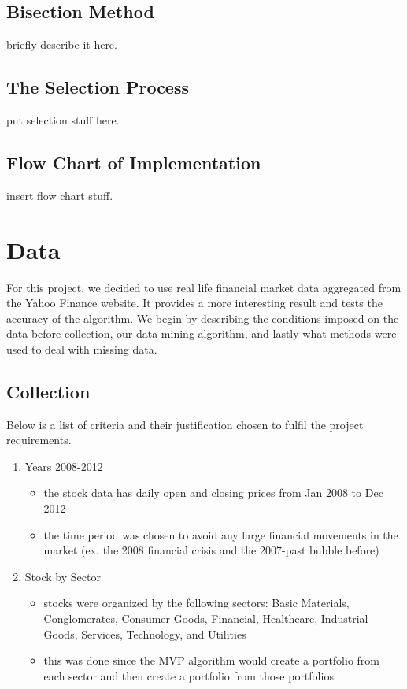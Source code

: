 \documentclass[12pt,titlepage,a4paper]{article}
\begin{document}
\subsection{Bisection Method}
briefly describe it here.

\subsection{The Selection Process}
put selection stuff here.

\subsection{Flow Chart of Implementation}
insert flow chart stuff. 

\section{Data}
For this project, we decided to use real life financial market data aggregated from the Yahoo Finance website. It provides a more interesting result and tests the accuracy of the algorithm. We begin by describing the conditions imposed on the data before collection, our data-mining algorithm, and lastly what methods were used to deal with missing data.
\subsection{Collection}
Below is a list of criteria and their justification chosen to fulfil the project requirements. 
\begin{enumerate}
\item Years 2008-2012
\begin{itemize}
\item the stock data has daily open and closing prices from Jan 2008 to Dec 2012
\item the time period was chosen to avoid any large financial movements in the market (ex. the 2008 financial crisis and the 2007-past bubble before)
\end{itemize}
\item Stock by Sector
\begin{itemize}
\item stocks were organized by the following sectors: Basic Materials, Conglomerates, Consumer Goods, Financial, Healthcare, Industrial Goods, Services, Technology, and Utilities
\item this was done since the MVP algorithm would create a portfolio from each sector and then create a portfolio from those portfolios
\end{itemize}
\end{enumerate}
\end{document}
